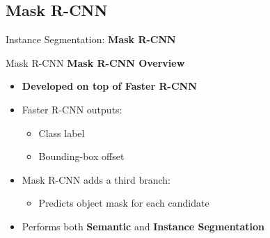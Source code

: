 \subsection{Mask R-CNN}
\begin{frame}{}
    \LARGE Instance Segmentation: \textbf{Mask R-CNN}
\end{frame}

\begin{frame}[allowframebreaks]{Mask R-CNN}
    \textbf{Mask R-CNN Overview}
    \begin{itemize}
        \item \textbf{Developed on top of Faster R-CNN}
        \item Faster R-CNN outputs:
        \begin{itemize}
            \item Class label
            \item Bounding-box offset
        \end{itemize}
        \item Mask R-CNN adds a third branch:
        \begin{itemize}
            \item Predicts object mask for each candidate
        \end{itemize}
        \item Performs both \textbf{Semantic} and \textbf{Instance Segmentation}
    \end{itemize}

\framebreak

    

\end{frame}
